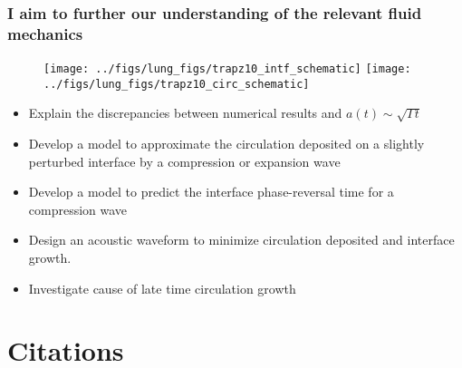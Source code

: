 \begin{frame}\frametitle{\vspace*{0.5cm}I aim to further our understanding of the relevant fluid mechanics}
  \begin{figure}
    \centering
    \texttt{[image: ../figs/lung\_figs/trapz10\_intf\_schematic]}\hspace{1cm}%
    \texttt{[image: ../figs/lung\_figs/trapz10\_circ\_schematic]}%
  \end{figure}

{\small
  \begin{itemize}
  \item Explain the discrepancies between numerical results and $a(t)\sim\sqrt{\Gamma t}$%
    \vspace*{5pt}
  \item Develop a model to approximate the circulation deposited on a
    slightly perturbed interface by a compression or expansion wave
    \vspace*{5pt}
  \item Develop a model to predict the interface phase-reversal time for a compression wave
    \vspace*{5pt}
  \item Design an acoustic waveform to minimize circulation deposited and interface growth.
    \vspace*{5pt}
  \item Investigate cause of late time circulation growth
  \end{itemize}
}
\end{frame}


\section{Citations}














